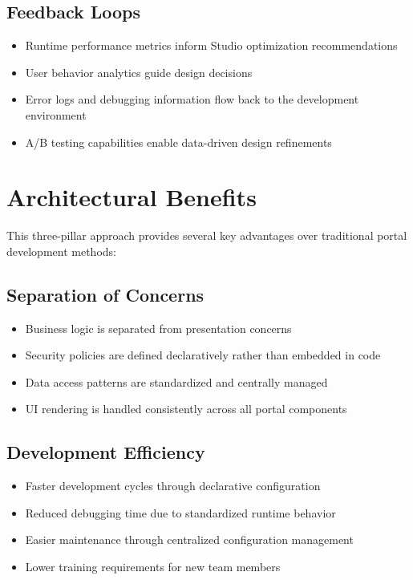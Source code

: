 \subsection{Feedback Loops}

\begin{itemize}
    \item Runtime performance metrics inform Studio optimization recommendations
    \item User behavior analytics guide design decisions
    \item Error logs and debugging information flow back to the development environment
    \item A/B testing capabilities enable data-driven design refinements
\end{itemize}

\section{Architectural Benefits}
\label{sec:architectural-benefits}

This three-pillar approach provides several key advantages over traditional portal development methods:

\subsection{Separation of Concerns}

\begin{itemize}
    \item Business logic is separated from presentation concerns
    \item Security policies are defined declaratively rather than embedded in code
    \item Data access patterns are standardized and centrally managed
    \item UI rendering is handled consistently across all portal components
\end{itemize}

\subsection{Development Efficiency}

\begin{itemize}
    \item Faster development cycles through declarative configuration
    \item Reduced debugging time due to standardized runtime behavior
    \item Easier maintenance through centralized configuration management
    \item Lower training requirements for new team members
\end{itemize}

